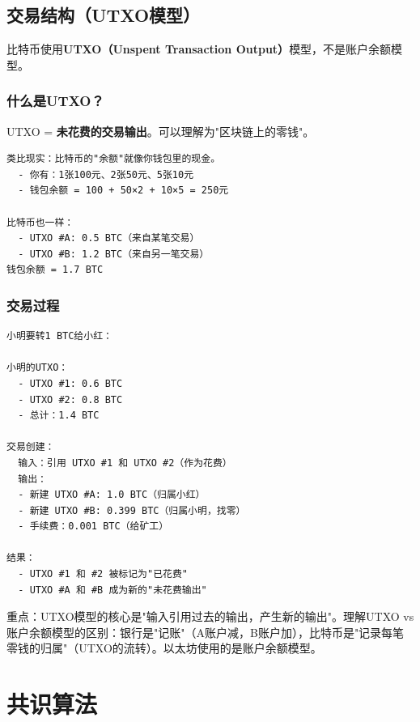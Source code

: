 ﻿\documentclass[12pt,a4paper]{article}
\begin{document}
\subsection{交易结构（UTXO模型）}

比特币使用\textbf{UTXO（Unspent Transaction Output）}模型，不是账户余额模型。

\subsubsection{什么是UTXO？}

UTXO = \textbf{未花费的交易输出}。可以理解为"区块链上的零钱"。

\begin{lstlisting}
类比现实：比特币的"余额"就像你钱包里的现金。
  - 你有：1张100元、2张50元、5张10元
  - 钱包余额 = 100 + 50×2 + 10×5 = 250元

比特币也一样：
  - UTXO #A: 0.5 BTC（来自某笔交易）
  - UTXO #B: 1.2 BTC（来自另一笔交易）
钱包余额 = 1.7 BTC
\end{lstlisting}

\subsubsection{交易过程}

\begin{lstlisting}
小明要转1 BTC给小红：

小明的UTXO：
  - UTXO #1: 0.6 BTC
  - UTXO #2: 0.8 BTC
  - 总计：1.4 BTC

交易创建：
  输入：引用 UTXO #1 和 UTXO #2（作为花费）
  输出：
  - 新建 UTXO #A: 1.0 BTC（归属小红）
  - 新建 UTXO #B: 0.399 BTC（归属小明，找零）
  - 手续费：0.001 BTC（给矿工）

结果：
  - UTXO #1 和 #2 被标记为"已花费"
  - UTXO #A 和 #B 成为新的"未花费输出"
\end{lstlisting}

\begin{keypointbox}
重点：UTXO模型的核心是"输入引用过去的输出，产生新的输出"。理解UTXO vs 账户余额模型的区别：银行是"记账"（A账户减，B账户加），比特币是"记录每笔零钱的归属"（UTXO的流转）。以太坊使用的是账户余额模型。
\end{keypointbox}

\section{共识算法}
\end{document}
